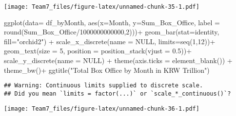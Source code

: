 \documentclass[
]{article}
\newenvironment{Shaded}{\begin{snugshade}}{\end{snugshade}}
\newcommand{\AttributeTok}[1]{\textcolor[rgb]{0.77,0.63,0.00}{#1}}
\newcommand{\ConstantTok}[1]{\textcolor[rgb]{0.00,0.00,0.00}{#1}}
\newcommand{\DecValTok}[1]{\textcolor[rgb]{0.00,0.00,0.81}{#1}}
\newcommand{\FloatTok}[1]{\textcolor[rgb]{0.00,0.00,0.81}{#1}}
\newcommand{\FunctionTok}[1]{\textcolor[rgb]{0.00,0.00,0.00}{#1}}
\newcommand{\NormalTok}[1]{#1}
\newcommand{\SpecialCharTok}[1]{\textcolor[rgb]{0.00,0.00,0.00}{#1}}
\newcommand{\StringTok}[1]{\textcolor[rgb]{0.31,0.60,0.02}{#1}}
\begin{document}
\texttt{[image: Team7\_files/figure-latex/unnamed-chunk-35-1.pdf]}

\begin{Shaded}
\begin{Highlighting}[]
\FunctionTok{ggplot}\NormalTok{(}\AttributeTok{data=}\NormalTok{ df\_byMonth, }\FunctionTok{aes}\NormalTok{(}\AttributeTok{x=}\NormalTok{Month, }\AttributeTok{y=}\NormalTok{Sum\_Box\_Office, }
      \AttributeTok{label =} \FunctionTok{round}\NormalTok{(Sum\_Box\_Office}\SpecialCharTok{/}\DecValTok{1000000000000}\NormalTok{,}\DecValTok{2}\NormalTok{)))}\SpecialCharTok{+}
  \FunctionTok{geom\_bar}\NormalTok{(}\AttributeTok{stat=}\StringTok{\textquotesingle{}identity\textquotesingle{}}\NormalTok{, }\AttributeTok{fill=}\StringTok{"orchid2"}\NormalTok{) }\SpecialCharTok{+}
  \FunctionTok{scale\_x\_discrete}\NormalTok{(}\AttributeTok{name =} \ConstantTok{NULL}\NormalTok{, }\AttributeTok{limits=}\FunctionTok{seq}\NormalTok{(}\DecValTok{1}\NormalTok{,}\DecValTok{12}\NormalTok{))}\SpecialCharTok{+}
  \FunctionTok{geom\_text}\NormalTok{(}\AttributeTok{size =} \DecValTok{5}\NormalTok{, }\AttributeTok{position =} \FunctionTok{position\_stack}\NormalTok{(}\AttributeTok{vjust =} \FloatTok{0.5}\NormalTok{))}\SpecialCharTok{+}
  \FunctionTok{scale\_y\_discrete}\NormalTok{(}\AttributeTok{name =} \ConstantTok{NULL}\NormalTok{) }\SpecialCharTok{+}
  \FunctionTok{theme}\NormalTok{(}\AttributeTok{axis.ticks =} \FunctionTok{element\_blank}\NormalTok{()) }\SpecialCharTok{+}
  \FunctionTok{theme\_bw}\NormalTok{()}\SpecialCharTok{+}
  \FunctionTok{ggtitle}\NormalTok{(}\StringTok{"Total Box Office by Month in KRW Trillion"}\NormalTok{)}
\end{Highlighting}
\end{Shaded}

\begin{verbatim}
## Warning: Continuous limits supplied to discrete scale.
## Did you mean `limits = factor(...)` or `scale_*_continuous()`?
\end{verbatim}

\texttt{[image: Team7\_files/figure-latex/unnamed-chunk-36-1.pdf]}
\end{document}
